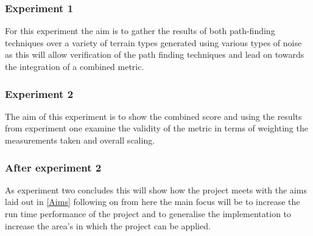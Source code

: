 \documentclass[12pt,a4paper]{article}
\begin{document}
\subsubsection{Experiment 1}
For this experiment the aim is to gather the results of both path-finding techniques over a variety of terrain types generated using various types of noise as this will allow verification of the path finding techniques and lead on towards the integration of a combined metric. 

\subsubsection{Experiment 2}
The aim of this experiment is to show the combined score and using the results from experiment one examine the validity of the metric in terms of weighting the measurements taken and overall scaling.

\subsubsection{After experiment 2} 
As experiment two concludes this will show how the project meets with the aims laid out in \ref{Aims} following on from here the main focus will be to increase the run time performance of the project and to generalise the implementation to increase the area's in which the project can be applied. 
\end{document}
